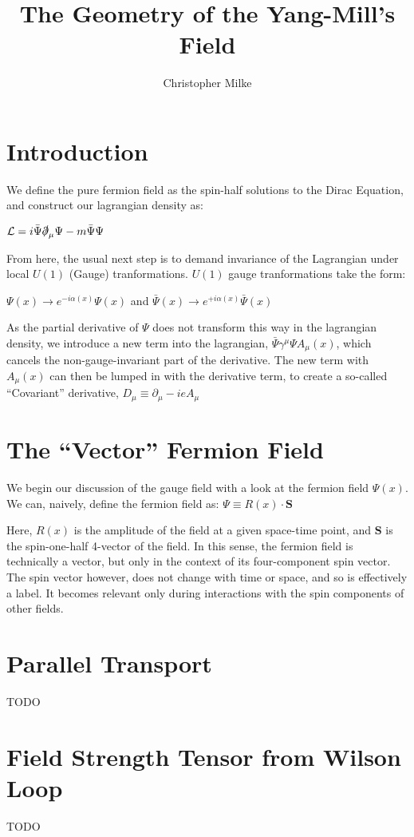 \documentclass{article}
\begin{document}
\title{The Geometry of the Yang-Mill's Field}
\author{Christopher Milke}

\maketitle

\section{Introduction}
        We define the pure fermion field as the spin-half solutions to the Dirac Equation, and construct our lagrangian density as:

        $ \mathcal{L} =  i \bar{\Psi} \slashed\partial_\mu \Psi - m \bar{\Psi} \Psi   $

        From here, the usual next step is to demand invariance of the Lagrangian under local $U(1)$ (Gauge) tranformations. $U(1)$ gauge tranformations take the form: 

        $ \Psi(x) \rightarrow e^{-i \alpha(x)} \Psi(x) $ and $ \bar\Psi(x) \rightarrow e^{+i \alpha(x)} \bar\Psi(x) $

        As the partial derivative of $\Psi$ does not transform this way in the lagrangian density, we introduce a new term into the lagrangian, 
        $  \bar{\Psi} \gamma^\mu \Psi A_\mu(x) $, which cancels the non-gauge-invariant part of the derivative. The new term with $A_\mu(x)$ can then be lumped in with the derivative term, to create a so-called ``Covariant'' derivative,
        $ D_\mu \equiv \partial_\mu - i e A_\mu $

\section{The ``Vector'' Fermion Field}
        We begin our discussion of the gauge field with a look at the fermion field $\Psi(x)$. We can, naively, define the fermion field as: 
        $\Psi \equiv R(x) \cdot \mathbf{S}$

        Here, $R(x)$ is the amplitude of the field at a given space-time point, and $\mathbf{S}$ is the spin-one-half 4-vector of the field.
        In this sense, the fermion field is technically a vector, but only in the context of its four-component spin vector. The spin vector however, does not change with time or space, and so is effectively a label. It becomes relevant only during interactions with the spin components of other fields.



\section{Parallel Transport}
        TODO

\section{Field Strength Tensor from Wilson Loop}
        TODO
\end{document}
